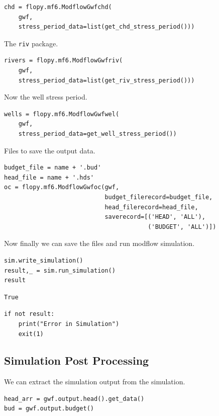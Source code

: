 \documentclass[titlepage,12pt]{unisubmission}
\begin{document}
\begin{verbatim}
chd = flopy.mf6.ModflowGwfchd(
    gwf,
    stress_period_data=list(get_chd_stress_period()))
\end{verbatim}

The \texttt{riv} package.

\begin{verbatim}
rivers = flopy.mf6.ModflowGwfriv(
    gwf,
    stress_period_data=list(get_riv_stress_period()))
\end{verbatim}

Now the well stress period.

\begin{verbatim}
wells = flopy.mf6.ModflowGwfwel(
    gwf,
    stress_period_data=get_well_stress_period())
\end{verbatim}

Files to save the output data.

\begin{verbatim}
budget_file = name + '.bud'
head_file = name + '.hds'
oc = flopy.mf6.ModflowGwfoc(gwf,
                            budget_filerecord=budget_file,
                            head_filerecord=head_file,
                            saverecord=[('HEAD', 'ALL'),
                                        ('BUDGET', 'ALL')])
\end{verbatim}

Now finally we can save the files and run modflow simulation.

\begin{verbatim}
sim.write_simulation()
result,_ = sim.run_simulation()
result
\end{verbatim}

\begin{verbatim}
True
\end{verbatim}

\begin{verbatim}
if not result:
    print("Error in Simulation")
    exit(1)
\end{verbatim}

\subsection{Simulation Post Processing}
\label{sec:org92fc9cb}
We can extract the simulation output from the simulation.

\begin{verbatim}
head_arr = gwf.output.head().get_data()
bud = gwf.output.budget()
\end{verbatim}
\end{document}
